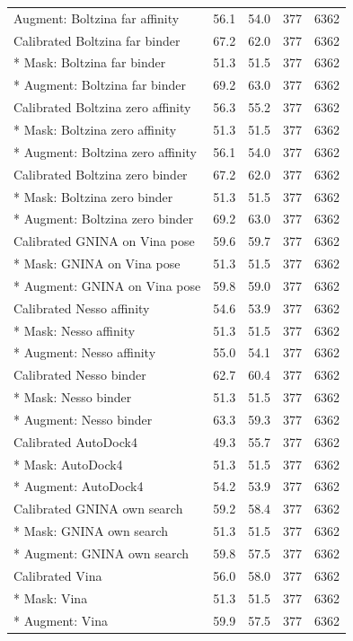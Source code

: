 \documentclass[pdflatex,sn-nature]{sn-jnl}
\begin{document}
\begin{longtable}{lrrrr}
Augment: Boltzina far affinity & 56.1 & 54.0 & 377 & 6362\\
Calibrated Boltzina far binder & 67.2 & 62.0 & 377 & 6362\\*
Mask: Boltzina far binder & 51.3 & 51.5 & 377 & 6362\\*
Augment: Boltzina far binder & 69.2 & 63.0 & 377 & 6362\\
Calibrated Boltzina zero affinity & 56.3 & 55.2 & 377 & 6362\\*
Mask: Boltzina zero affinity & 51.3 & 51.5 & 377 & 6362\\*
Augment: Boltzina zero affinity & 56.1 & 54.0 & 377 & 6362\\
Calibrated Boltzina zero binder & 67.2 & 62.0 & 377 & 6362\\*
Mask: Boltzina zero binder & 51.3 & 51.5 & 377 & 6362\\*
Augment: Boltzina zero binder & 69.2 & 63.0 & 377 & 6362\\
Calibrated GNINA on Vina pose & 59.6 & 59.7 & 377 & 6362\\*
Mask: GNINA on Vina pose & 51.3 & 51.5 & 377 & 6362\\*
Augment: GNINA on Vina pose & 59.8 & 59.0 & 377 & 6362\\
Calibrated Nesso affinity & 54.6 & 53.9 & 377 & 6362\\*
Mask: Nesso affinity & 51.3 & 51.5 & 377 & 6362\\*
Augment: Nesso affinity & 55.0 & 54.1 & 377 & 6362\\
Calibrated Nesso binder & 62.7 & 60.4 & 377 & 6362\\*
Mask: Nesso binder & 51.3 & 51.5 & 377 & 6362\\*
Augment: Nesso binder & 63.3 & 59.3 & 377 & 6362\\
Calibrated AutoDock4 & 49.3 & 55.7 & 377 & 6362\\*
Mask: AutoDock4 & 51.3 & 51.5 & 377 & 6362\\*
Augment: AutoDock4 & 54.2 & 53.9 & 377 & 6362\\
Calibrated GNINA own search & 59.2 & 58.4 & 377 & 6362\\*
Mask: GNINA own search & 51.3 & 51.5 & 377 & 6362\\*
Augment: GNINA own search & 59.8 & 57.5 & 377 & 6362\\
Calibrated Vina & 56.0 & 58.0 & 377 & 6362\\*
Mask: Vina & 51.3 & 51.5 & 377 & 6362\\*
Augment: Vina & 59.9 & 57.5 & 377 & 6362\\
\bottomrule
\end{longtable}
\normalsize
\end{document}
